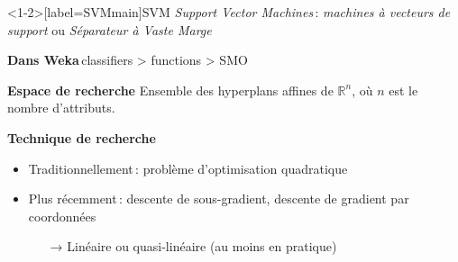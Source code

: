 \documentclass[hyperref={unicode}, xcolor={svgnames}, french]{beamer}
\begin{document}
\begin{frame}<1-2>[label=SVMmain]{SVM}
    \emph{Support Vector Machines} : \emph{machines à vecteurs de support} ou \emph{Séparateur à Vaste Marge}

    \textbf{Dans Weka} classifiers > functions > SMO
    \pause

    \textbf{Espace de recherche} Ensemble des hyperplans affines de $ℝ^n$, où $n$ est le nombre d'attributs.
    \pause

    \textbf{Technique de recherche}
    \begin{itemize}
        \item Traditionnellement : problème d'optimisation quadratique
        \item Plus récemment : descente de sous-gradient, descente de gradient par coordonnées
        \begin{itemize}
            \item[→] Linéaire ou quasi-linéaire (au moins en pratique)
        \end{itemize}
    \end{itemize}
\end{frame}
\end{document}
